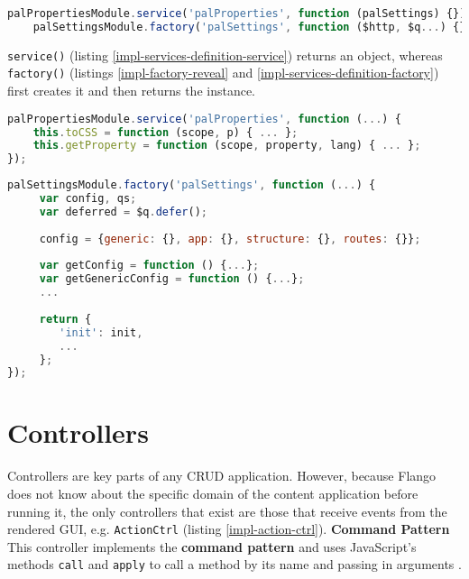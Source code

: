 \begin{lstlisting}[language=JavaScript,caption=Examples of service definition, label=impl-services-definition]
    palPropertiesModule.service('palProperties', function (palSettings) {});
    palSettingsModule.factory('palSettings', function ($http, $q...) {});
\end{lstlisting}




\texttt{service()} (listing \ref{impl-services-definition-service}) returns an object, whereas \texttt{factory()}  (listings \ref{impl-factory-reveal} and \ref{impl-services-definition-factory}) first creates it and then returns the instance.

\begin{lstlisting}[language=JavaScript,caption=Examples of service definition (service()), label=impl-services-definition-service]
palPropertiesModule.service('palProperties', function (...) {
    this.toCSS = function (scope, p) { ... };
    this.getProperty = function (scope, property, lang) { ... };
});
\end{lstlisting}

\begin{lstlisting}[language=JavaScript,caption=Examples of service definition (factory()), label=impl-services-definition-factory]
palSettingsModule.factory('palSettings', function (...) {
     var config, qs;
     var deferred = $q.defer();
     
     config = {generic: {}, app: {}, structure: {}, routes: {}};
     
     var getConfig = function () {...};
     var getGenericConfig = function () {...};
     ...
     
     return {
        'init': init,
        ...
     };
});
\end{lstlisting}

\section{Controllers}
\label{sec:controllers}
Controllers are key parts of any \ac{CRUD} application.
However, because Flango \cm does not know about the specific domain of the content application before running it, the only controllers that exist are those that receive events from the rendered \ac{GUI}, e.g. \texttt{ActionCtrl} (listing \ref{impl-action-ctrl}).
\textbf{Command Pattern} This controller implements the \textbf{command pattern} and uses JavaScript's methods \texttt{call} and \texttt{apply} to call a method by its name and passing in arguments \cite{Osmani:2012}.

